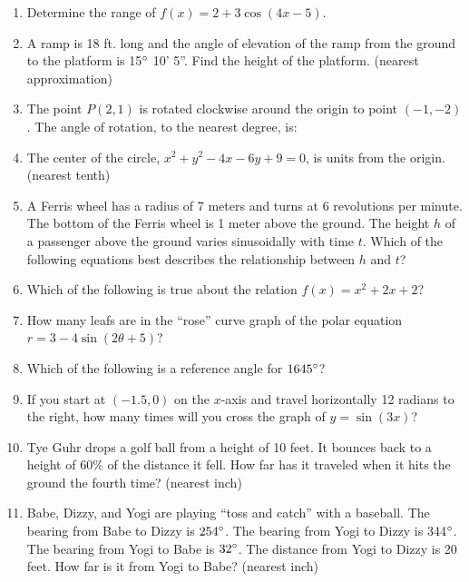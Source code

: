 \documentclass[../uilmath.tex]{subfiles}
\begin{document}
\begin{enumerate}[label=\bfseries\arabic*.]
    \item %
    Determine the range of $f(x)=2+3\cos(4x-5)$.

    \item %
    A ramp is 18 ft. long and the angle of elevation of the ramp from the ground to the platform 
    is 15$\degree$ 10' 5''. Find the height of the platform. (nearest approximation)

    \item %
    The point $P(2,1)$ is rotated clockwise around the origin to point $(-1,-2)$. The angle of rotation, to the nearest degree, is:

    \item %
    The center of the circle, $x^2+y^2-4x-6y+9=0$, is \blank units from the origin. (nearest tenth)

    \item %
    A Ferris wheel has a radius of 7 meters and turns at 6 revolutions per minute. The bottom of the Ferris wheel is 1 meter above the ground.
    The height $h$ of a passenger above the ground varies sinusoidally with time $t$. Which of the following equations best describes the relationship between $h$ and $t$?
    
    \item %
    Which of the following is true about the relation $f(x)=x^2+2x+2$?
    
    \item %
    How many leafs are in the ``rose'' curve graph of the polar equation $r=3-4\sin(2\theta+5)$?

    \item %
    Which of the following is a reference angle for $1645\degree$?

    \item %
    If you start at $(-1.5,0)$ on the $x$-axis and travel horizontally 12 radians to the right, how many times will you cross the graph of $y=\sin(3x)$?

    \item %
    Tye Guhr drops a golf ball from a height of 10 feet. It bounces back to a height of 60\% of the distance it fell.
    How far has it traveled when it hits the ground the fourth time? (nearest inch)
    
    \item %
    Babe, Dizzy, and Yogi are playing ``toss and catch'' with a baseball. The bearing from Babe to Dizzy is 
    $254\degree$. The bearing from Yogi to Dizzy is 344$\degree$. The bearing from Yogi to Babe is $32\degree$. 
    The distance from Yogi to Dizzy is 20 feet. How far is it from Yogi to Babe? (nearest inch)


\end{enumerate}
\end{document}
